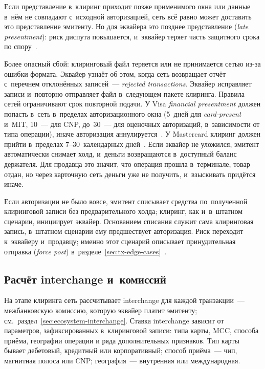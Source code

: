 Если представление в~клиринг приходит позже применимого окна или данные в~нём
не совпадают с~исходной авторизацией, сеть всё равно может доставить это
представление эмитенту. Но для эквайера это позднее представление (\textit{late
presentment}): риск диспута повышается, и~эквайер теряет часть защитного срока
по спору~\cite{visa-core-rules,mc-tpr,mc-chargeback-guide}.

Более опасный сбой: клиринговый файл теряется или не принимается сетью из-за
ошибки формата. Эквайер узнаёт об этом, когда сеть возвращает отчёт с~перечнем
отклонённых записей~--- \textit{rejected transactions}. Эквайер
исправляет записи и~повторно отправляет файл в~следующем пакете клиринга.
Правила сетей ограничивают срок повторной подачи. У Visa \textit{financial
presentment} должен попасть в~сеть в~пределах авторизационного окна (5~дней для
  \textit{card-present} и~MIT, 10~--- для CNP, до~30~--- для оценочных авторизаций,
в~зависимости от типа операции), иначе авторизация аннулируется~\cite{visa-core-rules}. У
Mastercard клиринг должен прийти в~пределах 7--30~календарных
дней~\cite{mc-tpr}. Если эквайер не уложился, эмитент автоматически снимает
холд, и~деньги возвращаются в~доступный баланс держателя. Для продавца это
значит, что операция прошла в~терминале, товар отдан, но через карточную сеть
деньги уже не получить, и~взыскивать придётся иначе.

Если авторизации не было вовсе, эмитент списывает средства по~полученной
клиринговой записи без предварительного холда; клиринг, как и~в~штатном
сценарии, инициирует эквайер. Основанием списания служит сама клиринговая
запись, в~штатном сценарии ему предшествует авторизация. Риск переходит к~эквайеру и~продавцу; именно этот сценарий описывает
принудительная отправка (\textit{force post})
в~разделе~\ref{sec:tx-edge-cases}~\cite{mc-tpr}.

\subsection*{Расчёт interchange и~комиссий}

На этапе клиринга сеть рассчитывает interchange для каждой транзакции~---
межбанковскую комиссию, которую эквайер платит эмитенту;
см.~раздел~\ref{sec:ecosystem-interchange}. Ставка interchange зависит от
параметров, зафиксированных в~клиринговой записи: типа карты, MCC, способа
приёма, географии операции и ряда дополнительных признаков. Тип карты бывает
дебетовый, кредитный или корпоративный; способ приёма~--- чип, магнитная полоса
или CNP; география~--- внутренняя или международная.


